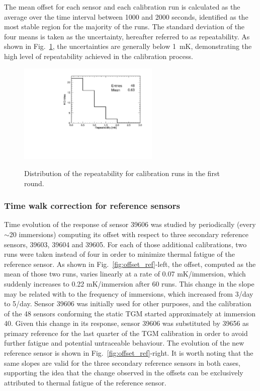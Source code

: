 The mean offset for each sensor and each calibration run is calculated as the average over the time interval between 1000 and 2000 seconds, identified as the most stable region for the majority of the runs. The standard deviation of the four means is taken as the uncertainty, hereafter referred to as repeatability. As shown in Fig.~\ref{fi:CAL_rms_1r}, the uncertainties are generally below 1~mK, demonstrating the high level of repeatability achieved in the calibration process.

\begin{figure}[htbp]
\centering
{\includegraphics[width=0.6\textwidth]{images/figure_11.pdf}}
\caption{Distribution of the repeatability for calibration runs in the first round.}
\label{fi:CAL_rms_1r}
\end{figure}

\subsubsection{Time walk correction for reference sensors}
\label{sec:reference_corrections}
\noindent Time evolution of the response of sensor 39606 was studied by periodically (every $\sim$20 immersions)  computing its offset with respect to three secondary reference sensors, 39603, 39604 and 39605. For each of those additional calibrations, two runs were taken instead of four in order to minimize thermal fatigue of the reference sensor. As shown in Fig.~\ref{fig:offset_ref}-left, the offset, computed as the mean of those two runs, varies linearly at a rate of 0.07 mK/immersion, which suddenly increases to 0.22 mK/immersion after 60 runs. This change in the slope may be related with to the frequency of immersions, which increased from 3/day to 5/day. Sensor 39606 was initially used for other purposes, and the calibration of the 48 sensors conforming the static TGM started approximately at immersion 40. Given this change in its response, sensor 39606 was substituted by 39656 as primary reference for the last quarter of the TGM calibration in order to avoid further fatigue and potential untraceable behaviour. The evolution of the new reference sensor is shown in Fig.~\ref{fig:offset_ref}-right. It is worth noting that the same slopes are valid for the three secondary reference sensors in both cases, supporting the idea that the change observed in the offsets can be exclusively attributed to thermal fatigue of the reference sensor.

